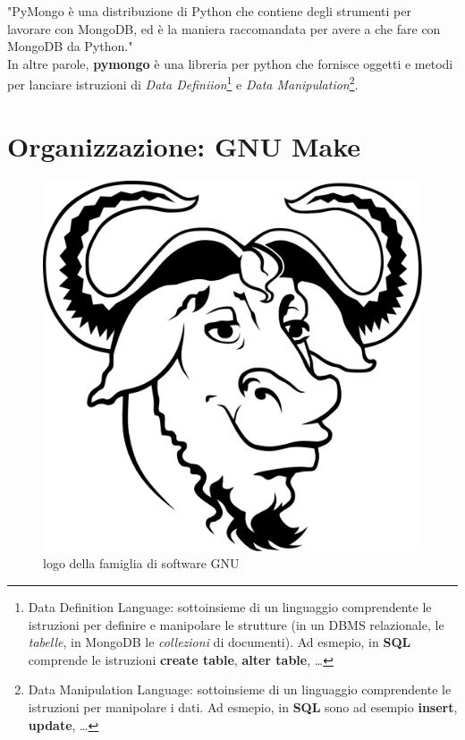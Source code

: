         "PyMongo è una distribuzione di Python che contiene degli strumenti per lavorare con MongoDB, ed è la maniera raccomandata per avere a che fare con MongoDB da Python." \\

        In altre parole, \textbf{pymongo} è una libreria per python che fornisce oggetti e metodi per lanciare istruzioni di \textit{Data Definiion}\footnote{Data Definition Language: sottoinsieme di un linguaggio comprendente le istruzioni per definire e manipolare le strutture (in un DBMS relazionale, le \textit{tabelle}, in MongoDB le \textit{collezioni} di documenti). Ad esmepio, in \textbf{SQL} comprende le istruzioni \textbf{create table}, \textbf{alter table}, \ldots} e \textit{Data Manipulation}\footnote{Data Manipulation Language: sottoinsieme di un linguaggio comprendente le istruzioni per manipolare i dati. Ad esmepio, in \textbf{SQL} sono ad esempio \textbf{insert}, \textbf{update}, \ldots}.

\section{Organizzazione: GNU Make}

    \begin{figure}
        \centering
        \caption{logo della famiglia di software GNU}
        \label{make}
        \includegraphics[scale=0.15]{img/gnu.png}
    \end{figure}

